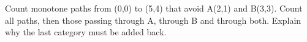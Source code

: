 \documentclass[11pt]{article}
\begin{document}
Count monotone paths from (0,0) to (5,4) that avoid A(2,1) and B(3,3). Count all paths, then those passing through A, through B and through both. Explain why the last category must be added back.\par
\vspace{5pt}
\end{document}
